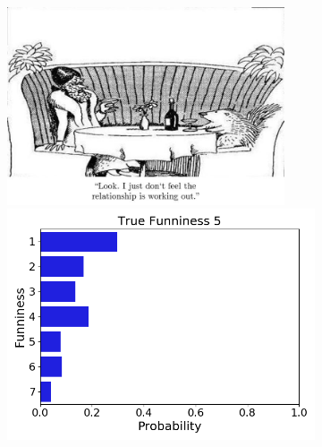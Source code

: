 \documentclass[draft,final,oneside]{vutinfth} %
\begin{document}
\begin{figure}
\centering

\begin{subfigure}[b]{0.45\textwidth}
\centering
\includegraphics[width=0.9\textwidth,height=0.3\textheight,keepaspectratio]{graphics/detail/Test_for_Image_5_cartoon} \\
\includegraphics[width=1.0\textwidth]{graphics/detail/Test_for_Image_5}
\end{subfigure}\quad
\begin{subfigure}[b]{0.45\textwidth}
\centering

\end{subfigure}
\end{figure}
\end{document}
